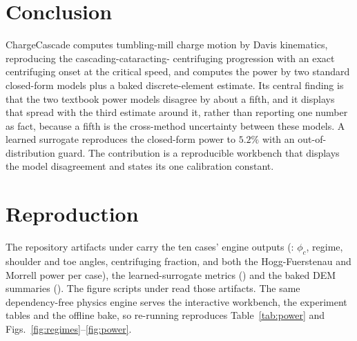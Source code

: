 \documentclass[journal]{IEEEtran}
\begin{document}
\section{Conclusion}

ChargeCascade computes tumbling-mill charge motion by Davis kinematics, reproducing the cascading-cataracting-%
centrifuging progression with an exact centrifuging onset at the critical speed, and computes the power by two
standard closed-form models plus a baked discrete-element estimate. Its central finding is that the two
textbook power models disagree by about a fifth, and it displays that spread with the third estimate around it,
rather than reporting one number as fact, because a fifth is the cross-method uncertainty between these models. A
learned surrogate reproduces the closed-form power to $5.2\%$ with an out-of-distribution guard. The
contribution is a reproducible workbench that displays the model disagreement and states its one calibration
constant.

\appendices
\section{Reproduction}\label{app:repro}

The repository artifacts under  carry the ten cases' engine outputs
(: $\phi_c$, regime, shoulder and toe angles, centrifuging fraction, and both the
Hogg-Fuerstenau and Morrell power per case), the learned-surrogate metrics () and the
baked DEM summaries (). The figure scripts under
 read those artifacts. The same dependency-free physics engine
serves the interactive workbench, the experiment tables and the offline bake, so re-running reproduces
Table~\ref{tab:power} and Figs.~\ref{fig:regimes}--\ref{fig:power}.

\balance
\end{document}
